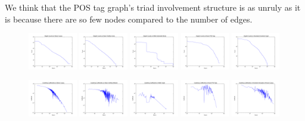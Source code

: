 \documentclass[12pt]{article}
\begin{document}
We think that the POS tag graph's triad involvement structure is as unruly as it is because there are so few nodes compared to the number of edges.

\begin{figure}
  \includegraphics[width=0.19\textwidth]{degree_plot}
  \includegraphics[width=0.19\textwidth]{overflow_degree_plot}
  \includegraphics[width=0.19\textwidth]{miller_degree_plot}
  \includegraphics[width=0.19\textwidth]{pos_degree_plot}
  \includegraphics[width=0.19\textwidth]{kron_degree_plot}

  \includegraphics[width=0.19\textwidth]{clustering_coeff}
  \includegraphics[width=0.19\textwidth]{overflow_clustering_coeff}
  \includegraphics[width=0.19\textwidth]{miller_clustering_coeff}
  \includegraphics[width=0.19\textwidth]{pos_clustering_coeff}
  \includegraphics[width=0.19\textwidth]{kron_clustering_coeff}
  

\end{figure}
\end{document}

